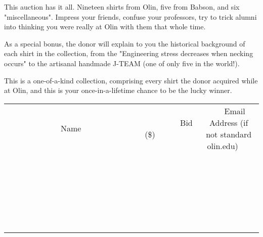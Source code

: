 \documentclass[11pt]{article}
\begin{document}
This auction has it all. Nineteen shirts from Olin, five from Babson, and six "miscellaneous". Impress your friends, confuse your professors, try to trick alumni into thinking you were really at Olin with them that whole time.

As a special bonus, the donor will explain to you the historical background of each shirt in the collection, from the "Engineering stress decreases when necking occurs" to the artisanal handmade J-TEAM (one of only five in the world!).

This is a one-of-a-kind collection, comprising every shirt the donor acquired while at Olin, and this is your once-in-a-lifetime chance to be the lucky winner.
\\[6ex]
\begin{tabular}{c c c}
~~~~~~~~~~~~~Name~~~~~~~~~~~~~ & ~~~~~~~~~Bid (\$)~~~~~~~~~  & ~~~Email Address (if not standard olin.edu)~~~\\
 & & \\
\hline
 & & \\
\hline
 & & \\
\hline
 & & \\
\hline
 & & \\
\hline
 & & \\
\hline
 & & \\
\hline
 & & \\
\hline
 & & \\
\hline
 & & \\
\hline
 & & \\
\hline
 & & \\
\hline
 & & \\
\hline
 & & \\
\hline
 & & \\
\hline
 & & \\
\hline
 & & \\
\hline
 & & \\
\hline
 & & \\
\hline
 & & \\
\hline
 & & \\
\hline
 & & \\
\hline
 & & \\
\hline
 & & \\
\hline
 & & \\
\hline
 & & \\
\hline
\end{tabular}
\newpage
\end{document}
